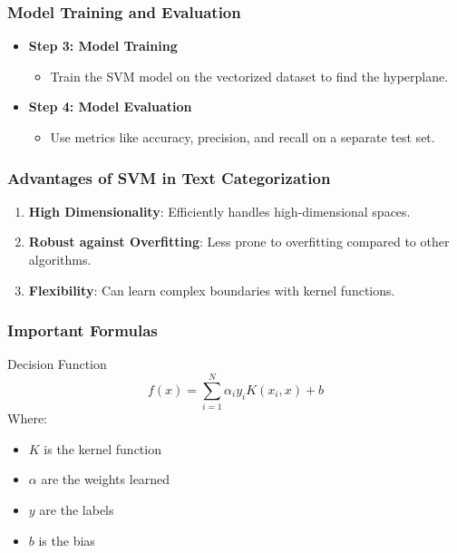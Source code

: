 \documentclass{beamer}
\begin{document}
\begin{frame}[fragile]
    \frametitle{Model Training and Evaluation}
    \begin{itemize}
        \item \textbf{Step 3: Model Training} 
            \begin{itemize}
                \item Train the SVM model on the vectorized dataset to find the hyperplane.
            \end{itemize}
        \item \textbf{Step 4: Model Evaluation} 
            \begin{itemize}
                \item Use metrics like accuracy, precision, and recall on a separate test set.
            \end{itemize}
    \end{itemize}
\end{frame}

\begin{frame}[fragile]
    \frametitle{Advantages of SVM in Text Categorization}
    \begin{enumerate}
        \item \textbf{High Dimensionality}: Efficiently handles high-dimensional spaces.
        \item \textbf{Robust against Overfitting}: Less prone to overfitting compared to other algorithms.
        \item \textbf{Flexibility}: Can learn complex boundaries with kernel functions.
    \end{enumerate}
\end{frame}

\begin{frame}[fragile]
    \frametitle{Important Formulas}
    \begin{block}{Decision Function}
        \begin{equation}
            f(x) = \sum_{i=1}^N \alpha_i y_i K(x_i, x) + b
        \end{equation}
        Where:
        \begin{itemize}
            \item \(K\) is the kernel function
            \item \(\alpha\) are the weights learned
            \item \(y\) are the labels
            \item \(b\) is the bias
        \end{itemize}
    \end{block}
\end{frame}
\end{document}
